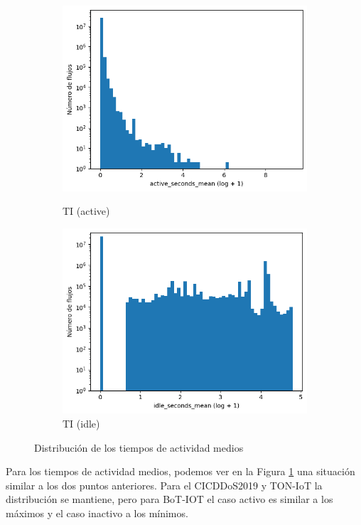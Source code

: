 \begin{figure}[H]
\begin{subfigure}[b]{0.26\textwidth}
        \includegraphics[width=\linewidth]{media/packet_pincer_toniot/active_seconds_mean_log_x_log_y.png}
        \caption{TI (active)}
        \includegraphics[width=\linewidth]{media/packet_pincer_toniot/idle_seconds_mean_log_x_log_y.png}
        \caption{TI (idle)}
    \end{subfigure}
       \caption{Distribución de los tiempos de actividad medios}
       \label{fig:packet_pincer_active_seconds_mean}
\end{figure}

Para los tiempos de actividad medios, podemos ver en la Figura \ref{fig:packet_pincer_active_seconds_mean} una situación similar a los dos puntos anteriores. Para el CICDDoS2019 y TON-IoT la distribución se mantiene, pero para BoT-IOT el caso activo es similar a los máximos y el caso inactivo a los mínimos.


